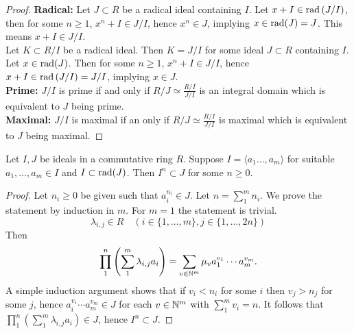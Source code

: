 \begin{proof}
    \textbf{Radical:} Let $J\subset R$ be a radical ideal containing $I$. Let $x+ I\in \mathrm{rad}\left(J/I\right)$, then for some $n\geq 1$, $x^n + I \in J/I$, hence $x^n \in J$, implying $x\in \mathrm{rad}(J) = J$. This means $x+I \in J/I$.\\
    Let $K \subset R/I$ be a radical ideal. Then $K=J/I$ for some ideal $J\subset R$ containing $I$. Let $x\in \mathrm{rad}(J)$. Then for some $n\geq 1$, $x^n+I\in J/I$, hence $x+I \in \mathrm{rad}\left(J/I\right) = J/I$, implying $x\in J$.\\  
    \textbf{Prime:}
        $J/I$ is prime if and only if $R/J\simeq \frac{R/I}{J/I}$ is an integral domain which is equivalent to $J$ being prime.\\    
    \textbf{Maximal:}
        $J/I$ is maximal if an only if $R/J\simeq \frac{R/I}{J/I}$ is maximal which is equivalent to $J$ being maximal.
\end{proof}
\begin{lemma}\label{RadicalLemma}
    Let $I,J$ be ideals in a commutative ring $R$. Suppose $I=\langle a_1\dots,a_m\rangle $ for suitable $a_1,\dots,a_m\in I$ and $I\subset \mathrm{rad}(J)$. Then $I^n \subset J$ for some $n\geq 0$.
\end{lemma}
\begin{proof}
     Let $n_i\geq 0$ be given such that $a_i^{n_i}\in J$. Let $n=\sum_1^m n_i$. We prove the statement by induction in $m$. For $m=1$ the statement is trivial. 
     $$\lambda_{i,j}\in R\quad (i\in\{1,\dots, m\}, j\in\{1,\dots,2n\})$$
     Then 
     $$\prod_1^{n} \left(\sum_1^{m} \lambda_{i,j}a_i\right) = \sum_{v\in \mathbb{N}^m} \mu_v a_1^{v_1}\cdots a_m^{v_m}.$$
     A simple induction argument shows that if $v_i< n_i$ for some $i$ then $v_j>n_j$ for some $j$, hence $a_i^{v_1}\cdots a_m^{v_m}\in J$ for each $v\in \mathbb{N}^m$ with $\sum_1^m v_i = n$. It follows that $\prod_1^{n} \left(\sum_1^{m} \lambda_{i,j}a_i\right)\in J$, hence $I^n\subset J$.
\end{proof}
